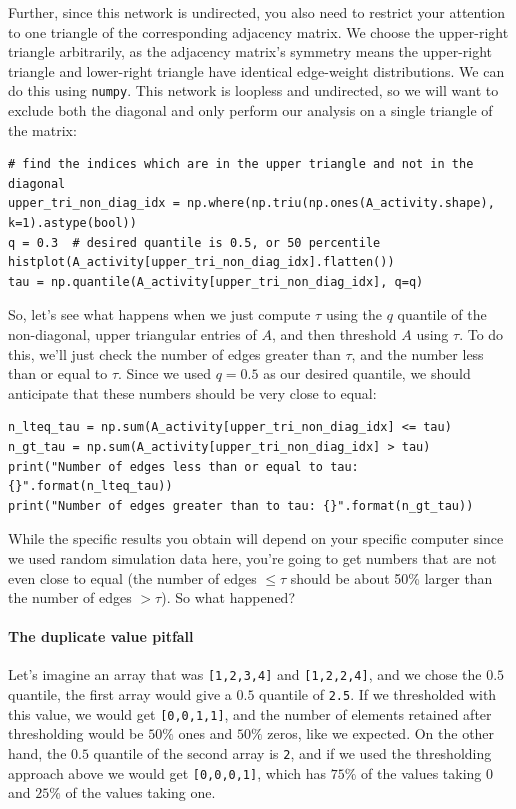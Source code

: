 Further, since this network is undirected, you also need to restrict your attention to one triangle of the corresponding adjacency matrix. We choose the upper-right triangle arbitrarily, as the adjacency matrix's symmetry means the upper-right triangle and lower-right triangle have identical edge-weight distributions. We can do this using \texttt{numpy}. This network is loopless and undirected, so we will want to exclude both the diagonal {and} only perform our analysis on a single triangle of the matrix:
\begin{lstlisting}[style=python]
# find the indices which are in the upper triangle and not in the diagonal
upper_tri_non_diag_idx = np.where(np.triu(np.ones(A_activity.shape), k=1).astype(bool))
q = 0.3  # desired quantile is 0.5, or 50 percentile
histplot(A_activity[upper_tri_non_diag_idx].flatten())
tau = np.quantile(A_activity[upper_tri_non_diag_idx], q=q)
\end{lstlisting}

So, let's see what happens when we just compute $\tau$ using the $q$ quantile of the non-diagonal, upper triangular entries of $A$, and then threshold $A$ using $\tau$. To do this, we'll just check the number of edges greater than $\tau$, and the number less than or equal to $\tau$. Since we used $q = 0.5$ as our desired quantile, we should anticipate that these numbers should be very close to equal:

\begin{lstlisting}[style=python]
n_lteq_tau = np.sum(A_activity[upper_tri_non_diag_idx] <= tau)
n_gt_tau = np.sum(A_activity[upper_tri_non_diag_idx] > tau)
print("Number of edges less than or equal to tau: {}".format(n_lteq_tau))
print("Number of edges greater than to tau: {}".format(n_gt_tau))
\end{lstlisting}
While the specific results you obtain will depend on your specific computer since we used random simulation data here, you're going to get numbers that are not even close to equal (the number of edges $\leq \tau$ should be about 50\% larger than the number of edges $> \tau$). So what happened?

\paragraph{The duplicate value pitfall}

Let's imagine an array that was \texttt{[1,2,3,4]} and \texttt{[1,2,2,4]}, and we chose the $0.5$ quantile, the first array would give a $0.5$ quantile of \texttt{2.5}. If we thresholded with this value, we would get \texttt{[0,0,1,1]}, and the number of elements retained after thresholding would be $50\%$ ones and $50\%$ zeros, like we expected. On the other hand, the $0.5$ quantile of the second array is \texttt{2}, and if we used the thresholding approach above we would get \texttt{[0,0,0,1]}, which has $75\%$ of the values taking $0$ and $25\%$ of the values taking one. 

